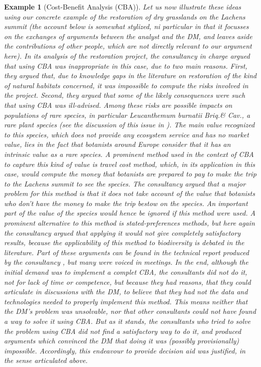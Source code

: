 \documentclass[preprint, french, english, 11pt, authoryear]{elsarticle}%
\newtheorem{example}{Example}
\begin{document}
\begin{example}[Cost-Benefit Analysis (CBA)]
Let us now illustrate these ideas using our concrete example of the restoration of dry grasslands on the Lachens summit (the account below is somewhat stylized, ni particular in that it focusses on the exchanges of arguments between the analyst and the \ac{DM}, and leaves aside the contributions of other people, which are not directly relevant to our argument here). In its analysis of the restoration project, the consultancy in charge argued that using CBA was inappropriate in this case, due to two main reasons. First, they argued that, due to knowledge gaps in the literature on restoration of the kind of natural habitats concerned, it was impossible to compute the risks involved in the project. Second, they argued that some of the likely consequences were such that using CBA was ill-advised. Among these risks are possible impacts on populations of rare species, in particular \emph{Leucanthemum burnatii} Briq.\@ \& Cav.\@, a rare plant species (see the discussion of this issue in \cite{meinard_ethical_2016}). The main value recognized to this species, which does not provide any ecosystem service and has no market value, lies in the fact that botanists around Europe consider that it has an intrinsic value as a rare species. A prominent method used in the context of CBA to capture this kind of value is travel cost method, which, in its application in this case, would compute the money that botanists are prepared to pay to make the trip to the Lachens summit to see the species. The consultancy argued that a major problem for this method is that it does not take account of the value that botanists who don't have the money to make the trip bestow on the species. An important part of the value of the species would hence be ignored if this method were used. A prominent alternative to this method is stated-preferences methods, but here again the consultancy argued that applying it would not give completely satisfactory results, because the applicability of this method to biodiversity is debated in the literature. Part of these arguments can be found in the technical report produced by the consultancy \citep{meinard_etude_2015}, but many were voiced in meetings. In the end, although the initial demand was to implement a complet CBA, the consultants did not do it, not for lack of time or competence, but because they had reasons, that they could articulate in discussions with the \ac{DM}, to believe that they had not the data and technologies needed to properly implement this method. This means neither that the \ac{DM}'s problem was unsolvable, nor that other consultants could not have found a way to solve it using CBA. But as it stands, the consultants who tried to solve the problem using CBA did not find a satisfactory way to do it, and produced arguments which convinced the \ac{DM} that doing it was (possibly provisionally) impossible. Accordingly, this endeavour to provide decision aid was justified, in the sense articulated above.
\end{example}
\end{document}

